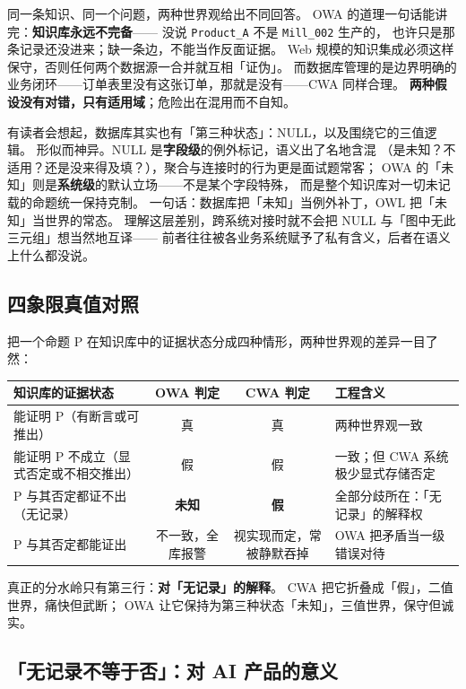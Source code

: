 同一条知识、同一个问题，两种世界观给出不同回答。
OWA 的道理一句话能讲完：\textbf{知识库永远不完备}——
没说 \texttt{Product\_A} 不是 \texttt{Mill\_002} 生产的，
也许只是那条记录还没进来；缺一条边，不能当作反面证据。
Web 规模的知识集成必须这样保守，否则任何两个数据源一合并就互相「证伪」。
而数据库管理的是边界明确的业务闭环——订单表里没有这张订单，那就是没有——CWA 同样合理。
\textbf{两种假设没有对错，只有适用域}；危险出在混用而不自知。

有读者会想起，数据库其实也有「第三种状态」：NULL，以及围绕它的三值逻辑。
形似而神异。NULL 是\textbf{字段级}的例外标记，语义出了名地含混
（是未知？不适用？还是没来得及填？），聚合与连接时的行为更是面试题常客；
OWA 的「未知」则是\textbf{系统级}的默认立场——不是某个字段特殊，
而是整个知识库对一切未记载的命题统一保持克制。
一句话：数据库把「未知」当例外补丁，OWL 把「未知」当世界的常态。
理解这层差别，跨系统对接时就不会把 NULL 与「图中无此三元组」想当然地互译——
前者往往被各业务系统赋予了私有含义，后者在语义上什么都没说。

\subsection{四象限真值对照}

把一个命题 P 在知识库中的证据状态分成四种情形，两种世界观的差异一目了然：

\begin{center}
\begin{tabularx}{\linewidth}{@{}XccX@{}}
\toprule
\textbf{知识库的证据状态} & \textbf{OWA 判定} & \textbf{CWA 判定} & \textbf{工程含义} \\
\midrule
能证明 P（有断言或可推出） & 真 & 真 & 两种世界观一致 \\
能证明 P 不成立（显式否定或不相交推出） & 假 & 假 &
一致；但 CWA 系统极少显式存储否定 \\
P 与其否定都证不出（无记录） & \textbf{未知} & \textbf{假} &
全部分歧所在：「无记录」的解释权 \\
P 与其否定都能证出 & 不一致，全库报警 & 视实现而定，常被静默吞掉 &
OWA 把矛盾当一级错误对待 \\
\bottomrule
\end{tabularx}
\end{center}

真正的分水岭只有第三行：\textbf{对「无记录」的解释}。
CWA 把它折叠成「假」，二值世界，痛快但武断；
OWA 让它保持为第三种状态「未知」，三值世界，保守但诚实。

\subsection{「无记录不等于否」：对 AI 产品的意义}

